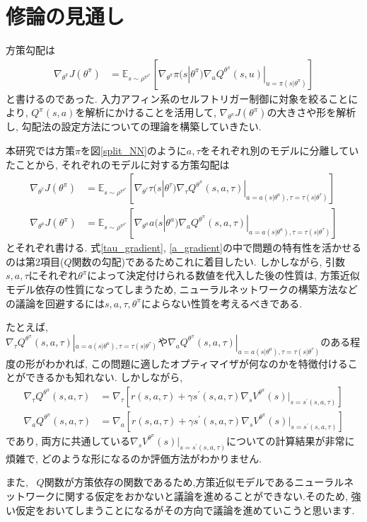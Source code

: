 \documentclass{jsarticle}
\newcommand{\expect}{\mathbb{E}}
\begin{document}
\section{修論の見通し}
方策勾配は
\begin{align}
	\nabla_{\theta^{\pi}}J(\theta^{\pi}) &= \expect_{s\sim\rho^{\pi^{\theta^{\pi}}}}[
	\nabla_{\theta^{\pi}}\pi(s|\theta^{\pi})\nabla_{u}Q^{\theta^{\pi}}(s, u)|_{u=\pi(s|\theta^{\pi})}] 
\end{align}
と書けるのであった. 入力アフィン系のセルフトリガー制御に対象を絞ることにより, $Q^{\pi}(s,a)$を解析にかけることを活用して, $\nabla_{\theta^{\pi}}J(\theta^{\pi})$の大きさや形を解析し, 勾配法の設定方法についての理論を構築していきたい. \par
本研究では方策$\pi$を図\ref{split_NN}のように$a,\tau$をそれぞれ別のモデルに分離していたことから, それぞれのモデルに対する方策勾配は
\begin{align}
	\nabla_{\theta^{\tau}}J(\theta^{\pi}) &= \expect_{s\sim\rho^{\pi^{\theta^{\pi}}}}[
	\nabla_{\theta^{\tau}}\tau(s|\theta^{\tau})\nabla_{\tau}Q^{\theta^{\pi}}(s, a, \tau)|_{a=a(s|\theta^a), \tau=\tau(s|\theta^{\tau})}] \label{tau_gradient}\\
	\nabla_{\theta^{a}}J(\theta^{\pi}) &= \expect_{s\sim\rho^{\pi^{\theta^{\pi}}}}[
	\nabla_{\theta^{a}}a(s|\theta^{a})\nabla_{a}Q^{\theta^{\pi}}(s, a, \tau)|_{a=a(s|\theta^a),\tau=\tau(s|\theta^{\tau})}] \label{a_gradient}
\end{align}
とそれぞれ書ける. 式\eqref{tau_gradient}, \eqref{a_gradient}の中で問題の特有性を活かせるのは第2項目($Q$関数の勾配)であるためこれに着目したい.
しかしながら, 引数$s,a,\tau$にそれぞれ$\theta^{\pi}$によって決定付けられる数値を代入した後の性質は, 方策近似モデル依存の性質になってしまうため, ニューラルネットワークの構築方法などの議論を回避するには$s,a,\tau,\theta^{\pi}$によらない性質を考えるべきである.\par
\fi
たとえば,~$\nabla_{\tau}Q^{\theta^{\pi}}(s, a, \tau)|_{a=a(s|\theta^a), \tau=\tau(s|\theta^{\tau})}や\nabla_{a}Q^{\theta^{\pi}}(s, a, \tau)|_{a=a(s|\theta^a), \tau=\tau(s|\theta^{\tau})}$のある程度の形がわかれば, この問題に適したオプティマイザが何なのかを特徴付けることができるかも知れない. しかしながら, 
\begin{align}
	\nabla_{\tau}Q^{\theta^{\pi}}(s, a, \tau) &= \nabla_{\tau}[r(s,a,\tau)+\gamma s^{\prime}(s,a,\tau)\nabla_{s}V^{\theta^{\pi}}(s)|_{s=s^{\prime}(s,a,\tau)}]\\
	\nabla_{a}Q^{\theta^{\pi}}(s, a, \tau) &= \nabla_{a}[r(s,a,\tau)+\gamma s^{\prime}(s,a,\tau)\nabla_{s}V^{\theta^{\pi}}(s)|_{s=s^{\prime}(s,a,\tau)}]
\end{align}
であり, 両方に共通している$\nabla_{s}V^{\theta^{\pi}}(s)|_{s=s^{\prime}(s,a,\tau)}$についての計算結果が非常に煩雑で, どのような形になるのか評価方法がわかりません. \par
また, ~$Q$関数が方策依存の関数であるため,方策近似モデルであるニューラルネットワークに関する仮定をおかないと議論を進めることができない.そのため, 強い仮定をおいてしまうことになるがその方向で議論を進めていこうと思います.
\end{document}
